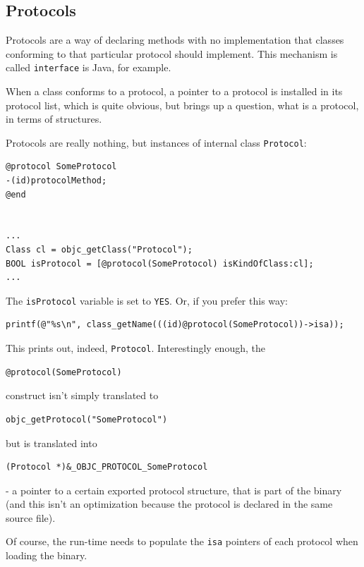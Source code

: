 \subsection{Protocols}

Protocols are a way of declaring methods with no implementation that classes conforming to that particular protocol should implement. This mechanism is called \verb=interface= is Java, for example.

When a class conforms to a protocol, a pointer to a protocol is installed in its protocol list, which is quite obvious, but brings up a question, what is a protocol, in terms of structures.

Protocols are really nothing, but instances of internal class \verb=Protocol=:

\begin{verbatim}
@protocol SomeProtocol
-(id)protocolMethod;
@end


...
Class cl = objc_getClass("Protocol");
BOOL isProtocol = [@protocol(SomeProtocol) isKindOfClass:cl];
...
\end{verbatim}

The \verb=isProtocol= variable is set to \verb=YES=. Or, if you prefer this way:

\begin{verbatim}
printf(@"%s\n", class_getName(((id)@protocol(SomeProtocol))->isa));
\end{verbatim}

This prints out, indeed, \verb=Protocol=. Interestingly enough, the

\begin{verbatim}@protocol(SomeProtocol)\end{verbatim}
  
construct isn't simply translated to

\begin{verbatim}objc_getProtocol("SomeProtocol")\end{verbatim}

but is translated into 

\begin{verbatim}(Protocol *)&_OBJC_PROTOCOL_SomeProtocol\end{verbatim}

- a pointer to a certain exported protocol structure, that is part of the binary (and this isn't an optimization because the protocol is declared in the same source file).

Of course, the run-time needs to populate the \verb=isa= pointers of each protocol when loading the binary.

